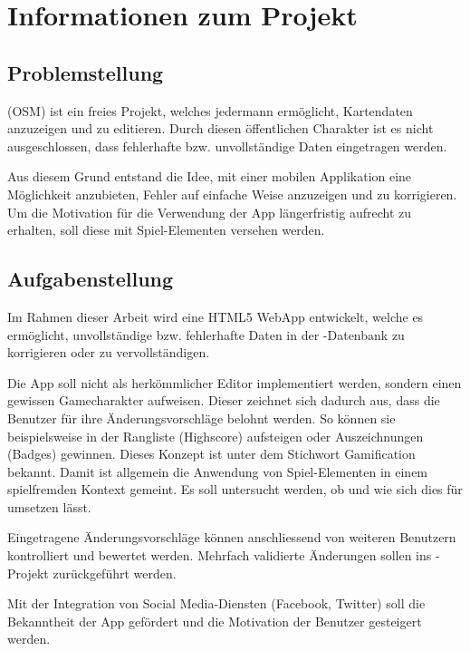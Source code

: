\chapter{Informationen zum Projekt}
\label{informationen-projekt}


\section{Problemstellung}
 (OSM) ist ein freies Projekt, welches jedermann ermöglicht, Kartendaten anzuzeigen und zu editieren.
Durch diesen öffentlichen Charakter ist es nicht ausgeschlossen, dass fehlerhafte bzw. unvollständige Daten eingetragen werden.

Aus diesem Grund entstand die Idee, mit einer mobilen Applikation eine Möglichkeit anzubieten, Fehler auf einfache Weise anzuzeigen und zu korrigieren.
Um die Motivation für die Verwendung der App längerfristig aufrecht zu erhalten, soll diese mit Spiel-Elementen versehen werden.

\section{Aufgabenstellung}
Im Rahmen dieser Arbeit wird eine HTML5 \gls{WebApp} entwickelt, welche es ermöglicht, unvollständige bzw. fehlerhafte Daten in der -Datenbank zu korrigieren oder zu vervollständigen.

Die App soll nicht als herkömmlicher Editor implementiert werden, sondern einen gewissen Gamecharakter aufweisen.
Dieser zeichnet sich dadurch aus, dass die Benutzer für ihre Änderungsvorschläge belohnt werden.
So können sie beispielsweise in der Rangliste (Highscore) aufsteigen oder Auszeichnungen (Badges) gewinnen.
Dieses Konzept ist unter dem Stichwort \gls{Gamification} bekannt.
Damit ist allgemein die Anwendung von Spiel-Elementen in einem spielfremden Kontext gemeint.
Es soll untersucht werden, ob und wie sich dies für  umsetzen lässt.

Eingetragene Änderungsvorschläge können anschliessend von weiteren Benutzern kontrolliert und bewertet werden.
Mehrfach validierte Änderungen sollen ins -Projekt zurückgeführt werden.

Mit der Integration von Social Media-Diensten (Facebook, Twitter) soll die Bekanntheit der App gefördert und die Motivation der Benutzer gesteigert werden.

